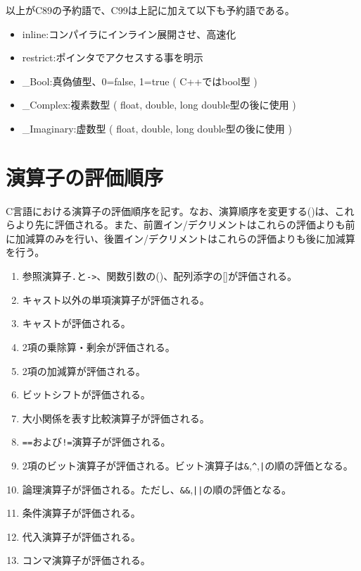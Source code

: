 以上がC89の予約語で、C99は上記に加えて以下も予約語である。
\begin{itemize}
\item inline:コンパイラにインライン展開させ、高速化
\item restrict:ポインタでアクセスする事を明示
\item \_Bool:真偽値型、0=false, 1=true ( C++ではbool型 )
\item \_Complex:複素数型 ( float, double, long double型の後に使用 )
\item \_Imaginary:虚数型 ( float, double, long double型の後に使用 )
\end{itemize}


\section{演算子の評価順序}
C言語における演算子の評価順序を記す。なお、演算順序を変更する()は、これらより先に評価される。また、前置イン/デクリメントはこれらの評価よりも前に加減算のみを行い、後置イン/デクリメントはこれらの評価よりも後に加減算を行う。
\begin{enumerate}
\item 参照演算子\verb|.|と\verb|->|、関数引数の()、配列添字の[]が評価される。
\item キャスト以外の単項演算子が評価される。
\item キャストが評価される。
\item 2項の乗除算・剰余が評価される。
\item 2項の加減算が評価される。
\item ビットシフトが評価される。
\item 大小関係を表す比較演算子が評価される。
\item \verb|==|および\verb|!=|演算子が評価される。
\item 2項のビット演算子が評価される。ビット演算子は\verb|&|,\verb|^|,\verb`|`の順の評価となる。
\item 論理演算子が評価される。ただし、\verb|&&|,\verb`||`の順の評価となる。
\item 条件演算子が評価される。
\item 代入演算子が評価される。
\item コンマ演算子が評価される。
\end{enumerate}

